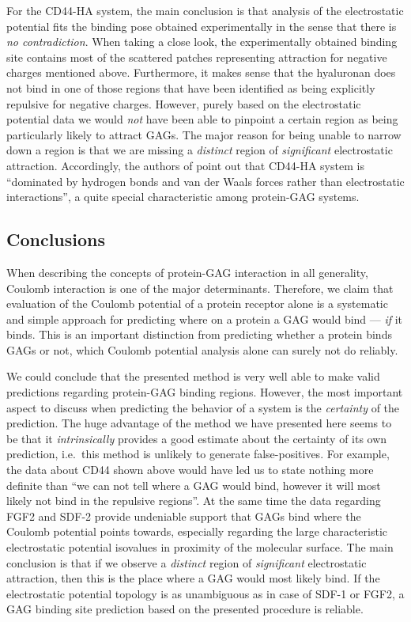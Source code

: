 For the CD44-HA system, the main conclusion is that analysis of the
electrostatic potential fits the binding pose obtained experimentally in the
sense that there is \textit{no contradiction}. When taking a close look, the
experimentally obtained binding site contains most of the scattered patches
representing attraction for negative charges mentioned above. Furthermore, it
makes sense that the hyaluronan does not bind in one of those regions that have
been identified as being explicitly repulsive for negative charges. However,
purely based on the electrostatic potential data we would \textit{not} have been
able to pinpoint a certain region as being particularly likely to attract GAGs.
The major reason for being unable to narrow down a region is that we are missing
a \textit{distinct} region of \textit{significant} electrostatic attraction.
Accordingly, the authors of \cite{cd44_hya_2007} point out that CD44-HA system
is  \enquote{dominated by hydrogen bonds and van der Waals forces rather than
electrostatic interactions}, a quite special characteristic among protein-GAG
systems.



\subsection{Conclusions}
\label{bspred:general_conclusions}

When describing the concepts of protein-GAG interaction in all generality,
Coulomb interaction is one of the major determinants. Therefore, we claim that
evaluation of the Coulomb potential of a protein receptor alone is a systematic
and simple approach for predicting where on a protein a GAG would bind ---
\textit{if} it binds. This is an important distinction from predicting whether a
protein binds GAGs or not, which Coulomb potential analysis alone can surely not
do reliably.

We could conclude that the presented method is very well able to make valid
predictions regarding protein-GAG binding regions. However, the most important
aspect to discuss when predicting the behavior of a system is the
\textit{certainty} of the prediction. The huge advantage of the method we have
presented here seems to be that it \textit{intrinsically} provides a good
estimate about the certainty of its own prediction, i.e.\ this method is
unlikely to generate false-positives. For example, the data about CD44 shown
above would have led us to state nothing more definite than \enquote{we can not
tell where a GAG would bind, however it will most likely not bind in the
repulsive regions}. At the same time the data regarding FGF2 and SDF-2 provide
undeniable support that GAGs bind where the Coulomb potential points towards,
especially regarding the large characteristic electrostatic potential isovalues
in proximity of the molecular surface. The main conclusion is that if we observe
a \textit{distinct} region of \textit{significant} electrostatic attraction,
then this is the place where a GAG would most likely bind. If the electrostatic
potential topology is as unambiguous as in case of SDF-1 or FGF2, a GAG binding
site prediction based on the presented procedure is reliable.

